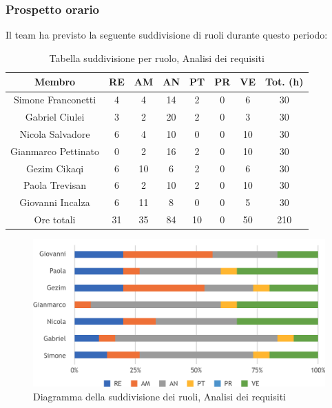 \subsubsection{Prospetto orario}
Il team ha previsto la seguente suddivisione di ruoli durante questo periodo:\\
\begin{table}[h]
\caption{Tabella suddivisione per ruolo, Analisi dei requisiti}
\begin{center}
\begin{tabular}{ |c|c|c|c|c|c|c|c|  }
 \hline
 Membro 		& RE 	& AM 	& AN 	& PT 	& PR 	& VE 	& Tot. (h)\\
 \hline\hline
 Simone	Franconetti		& 4 		& 4 		& 14 	& 2 		& 0 		& 6 		& 30\\
 Gabriel Ciulei			& 3 		& 2 		& 20 	& 2 		& 0 		& 3 		& 30\\
 Nicola	Salvadore		& 6 		& 4 		& 10 	& 0 		& 0 		& 10 	& 30\\
 Gianmarco	Pettinato	& 0 		& 2 		& 16 	& 2 		& 0 		& 10 	& 30\\
 Gezim	Cikaqi			& 6 		& 10 	 	& 6 		& 2 		& 0 		& 6	 	& 30\\
 Paola	Trevisan		& 6 		& 2 		& 10 	& 2 		& 0 		& 10 	& 30\\
 Giovanni	Incalza		& 6 		& 11 		& 8 		& 0 		& 0 		& 5  	& 30\\
 \hline\hline
 Ore totali		& 31		& 35		& 84 	& 10 	& 0 		& 50 	& 210\\
  \hline
\end{tabular}
\end{center}
\end{table}
\begin{figure}[h!]
	\includegraphics[width=\textwidth]{res/img/hi17}
	\caption{Diagramma della suddivisione dei ruoli, Analisi dei requisiti}
\end{figure}

